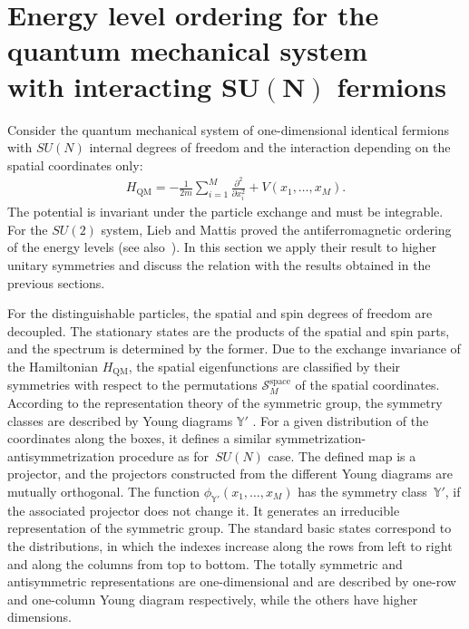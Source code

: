\documentclass[pdftex]{sigma}
\newcommand{\yn}{\mathbb{Y}}
\begin{document}
\section[Energy level ordering for the quantum mechanical system with
interacting $SU(N)$ fermions]{Energy level ordering for the quantum mechanical system\\ with
interacting $\boldsymbol{SU(N)}$ fermions}\label{section7}

Consider the  quantum mechanical system of one-dimensional identical
fermions with $SU(N)$ internal degrees of freedom and the interaction
depending on the spatial coordinates only:
\begin{gather}
\label{QM}
H_\text{QM}=-\frac{1}{2m}\sum_{i=1}^M \frac{\partial^2}{\partial x_i^2} + V(x_1,\dots,x_M).
\end{gather}
The potential is invariant under the particle exchange and must be integrable.
For the  $SU(2)$ system,  Lieb and Mattis proved the antiferromagnetic ordering
 of the energy levels \cite{LM62'} (see also~\cite{Mattis}).
In this section we apply their result to higher unitary symmetries
and  discuss the relation with the results obtained in the previous sections.

For the distinguishable particles, the  spatial and spin degrees of freedom are decoupled. The
stationary states are the products of the spatial and spin parts, and the spectrum is determined by
the former.
Due to the exchange invariance of the Hamiltonian $H_\text{QM}$, the spatial eigenfunctions
are classif\/ied by their symmetries with respect to the permutations
$\mathcal{S}_M^\text{space}$  of the spatial coordinates.
According to the representation theory of the symmetric group, the symmetry classes are described
by Young  diagrams $\yn'$ \cite{LM62',Landau,Hamermesh}. For a given distribution of the coordinates along the
boxes, it  def\/ines a similar symmetrization-antisymmetrization procedure as for~$SU(N)$ case.
The def\/ined map is a projector, and the projectors
constructed from the dif\/fe\-rent Young diagrams are mutually orthogonal.
The function $\phi_{\yn'}(x_1,\dots,x_M)$ has the  symmetry class~$\yn'$,
if the associated projector does not change it.
It generates an irreducible representation of the symmetric group.
The standard basic states correspond to the distributions, in which the indexes
increase along the rows from left to right and along the columns from top to bottom.
The totally symmetric and antisymmetric representations are one-dimensional
and are described by one-row and one-column Young diagram respectively, while the
others have higher dimensions.
\end{document}
